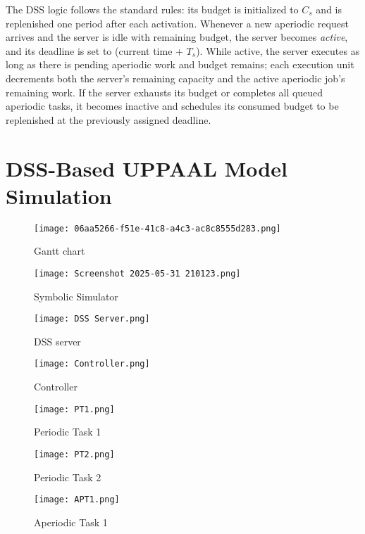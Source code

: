 \documentclass[conference]{IEEEtran}
\begin{document}
The DSS logic follows the standard rules: its budget is initialized to $C_s$ and is replenished one period after each activation\cite{cpen432}. Whenever a new aperiodic request arrives and the server is idle with remaining budget, the server becomes \emph{active}, and its deadline is set to (current time + $T_s$)\cite{cpen432}. While active, the server executes as long as there is pending aperiodic work and budget remains; each execution unit decrements both the server’s remaining capacity and the active aperiodic job’s remaining work. If the server exhausts its budget or completes all queued aperiodic tasks, it becomes inactive and schedules its consumed budget to be replenished at the previously assigned deadline\cite{buttazzo2011hard, cpen432}.

\section{DSS-Based UPPAAL Model Simulation}
\begin{figure}
    \centering
    \texttt{[image: 06aa5266-f51e-41c8-a4c3-ac8c8555d283.png]}
    \caption{Gantt chart}
    \label{fig:enter-label}
\end{figure}
\begin{figure}
    \centering
    \texttt{[image: Screenshot 2025-05-31 210123.png]}
    \caption{Symbolic Simulator}
    \label{fig:enter-label}
\end{figure}
\begin{figure}
    \centering
    \texttt{[image: DSS Server.png]}
    \caption{DSS server}
    \end{figure}
\begin{figure}
    \centering
    \texttt{[image: Controller.png]}
    \caption{Controller}
        \label{fig:enter-label}
\end{figure}
 \begin{figure}
        \centering
        \texttt{[image: PT1.png]}
        \caption{Periodic Task 1}
         \label{fig:enter-label}
    \end{figure}
\begin{figure}
            \centering
            \texttt{[image: PT2.png]}
            \caption{Periodic Task 2}
             \label{fig:enter-label}
        \end{figure}
\begin{figure}
                \centering
                \texttt{[image: APT1.png]}
                \caption{Aperiodic Task 1}
                \label{fig:enter-label}
            \end{figure}
\end{document}
